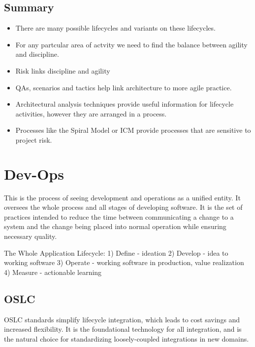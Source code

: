 \documentclass[a4paper]{article}
\begin{document}
\subsection{Summary}
\begin{itemize}
\item There are	many possible lifecycles and variants on	
these lifecycles.	
\item For any partcular	area of	actvity	we need to find the	
balance	between	agility	and	discipline.	
\item  Risk	links	discipline	and	agility	
\item QAs, scenarios and tactics help link architecture to	
more agile practice.	
\item Architectural	analysis techniques	provide	useful	
information for lifecycle activities, however they are	
arranged in	a process.	
\item Processes	like the Spiral	Model or ICM provide	
processes that are	sensitive to project risk.
\end{itemize}

\newpage
\section{Dev-Ops}
This is the process of seeing development and operations as a unified entity. It oversees the whole process and all stages of developing software. It is the set of practices intended to reduce the time between communicating a change to a system and the change being placed into normal operation while ensuring necessary quality. 

The Whole Application Lifecycle:
1)  Define - ideation
2)  Develop - idea to working software
3)  Operate - working software in production, value realization
4)  Measure - actionable learning

\subsection{OSLC}
OSLC standards simplify lifecycle integration, which leads to cost savings and increased flexibility.
It is the foundational technology for all integration, and is the natural choice for standardizing loosely-coupled integrations in new domains. 
\end{document}
